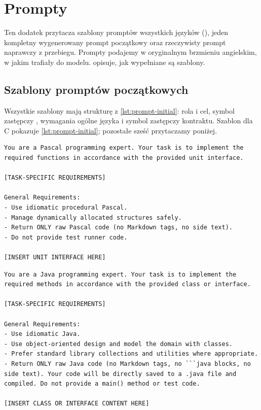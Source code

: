 \chapter{Prompty}
\label{app:prompts}

Ten dodatek przytacza szablony promptów wszystkich języków (), jeden
kompletny wygenerowany prompt początkowy oraz rzeczywisty prompt naprawczy z przebiegu. Prompty
podajemy w oryginalnym brzmieniu angielskim, w jakim trafiały do modelu.  opisuje,
jak wypełniane są szablony.

\section{Szablony promptów początkowych}
\label{app:templates}

Wszystkie szablony mają strukturę z \cref{lst:prompt-initial}: rola i cel, symbol zastępczy
, wymagania ogólne języka i symbol zastępczy kontraktu. Szablon
dla C pokazuje \cref{lst:prompt-initial}; pozostałe sześć przytaczamy poniżej.

\begin{lstlisting}[style=prompt,caption={Szablon promptu początkowego: Pascal.}]
You are a Pascal programming expert. Your task is to implement the required functions in accordance with the provided unit interface.

[TASK-SPECIFIC REQUIREMENTS]

General Requirements:
- Use idiomatic procedural Pascal.
- Manage dynamically allocated structures safely.
- Return ONLY raw Pascal code (no Markdown tags, no side text).
- Do not provide test runner code.

[INSERT UNIT INTERFACE HERE]
\end{lstlisting}

\begin{lstlisting}[style=prompt,caption={Szablon promptu początkowego: Java.}]
You are a Java programming expert. Your task is to implement the required methods in accordance with the provided class or interface.

[TASK-SPECIFIC REQUIREMENTS]

General Requirements:
- Use idiomatic Java.
- Use object-oriented design and model the domain with classes.
- Prefer standard library collections and utilities where appropriate.
- Return ONLY raw Java code (no Markdown tags, no ```java blocks, no side text). Your code will be directly saved to a .java file and compiled. Do not provide a main() method or test code.

[INSERT CLASS OR INTERFACE CONTENT HERE]
\end{lstlisting}

